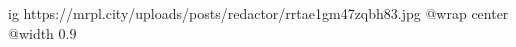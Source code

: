  
 
 
 
 

\ifcmt
  ig https://mrpl.city/uploads/posts/redactor/rrtae1gm47zqbh83.jpg
  @wrap center
  @width 0.9
\fi
